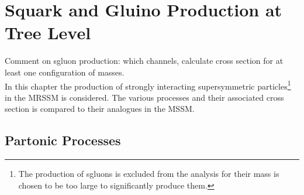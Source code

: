 \section{Squark and Gluino Production at Tree Level}
Comment on sgluon production: which channels, calculate cross section for at least one configuration of masses.\\
In this chapter the production of strongly interacting supersymmetric particles\footnote{The production of sgluons is excluded from the analysis for their mass is chosen to be too large to significantly produce them.} in the MRSSM is considered. The various processes and their associated cross section is compared to their analogues in the MSSM.


\subsection{Partonic Processes} 
